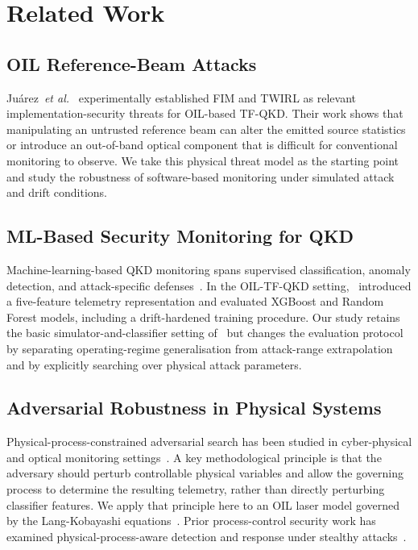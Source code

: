 \documentclass[journal,twocolumn]{IEEEtran}
\begin{document}
\section{Related Work}
\label{sec:related}

\subsection{OIL Reference-Beam Attacks}

Juárez~\emph{et al.}~\cite{juarez2026} experimentally established FIM and TWIRL as
relevant implementation-security threats for OIL-based TF-QKD. Their work shows that
manipulating an untrusted reference beam can alter the emitted source statistics or
introduce an out-of-band optical component that is difficult for conventional
monitoring to observe. We take this physical threat model as the starting point and
study the robustness of software-based monitoring under simulated attack and drift
conditions.

\subsection{ML-Based Security Monitoring for QKD}

Machine-learning-based QKD monitoring spans supervised classification, anomaly
detection, and attack-specific defenses~\cite{baliuka2023,almohammed2021,tunc2023,
du2022,luo2022,ding2023mads,xu2024mlqkd,liu2025}. In the OIL-TF-QKD setting,~\cite{basepaper}
introduced a five-feature telemetry representation and evaluated XGBoost and Random
Forest models, including a drift-hardened training procedure. Our study retains the
basic simulator-and-classifier setting of~\cite{basepaper} but changes the evaluation
protocol by separating operating-regime generalisation from attack-range
extrapolation and by explicitly searching over physical attack parameters.

\subsection{Adversarial Robustness in Physical Systems}

Physical-process-constrained adversarial search has been studied in cyber-physical
and optical monitoring settings~\cite{deng2017,papernot2016,peng2023}. A key
methodological principle is that the adversary should perturb controllable physical
variables and allow the governing process to determine the resulting telemetry,
rather than directly perturbing classifier features. We apply that principle here to
an OIL laser model governed by the Lang-Kobayashi equations~\cite{lang1980}. Prior
process-control security work has examined physical-process-aware detection and
response under stealthy attacks~\cite{cardenas2011,urbina2016}.
\end{document}
